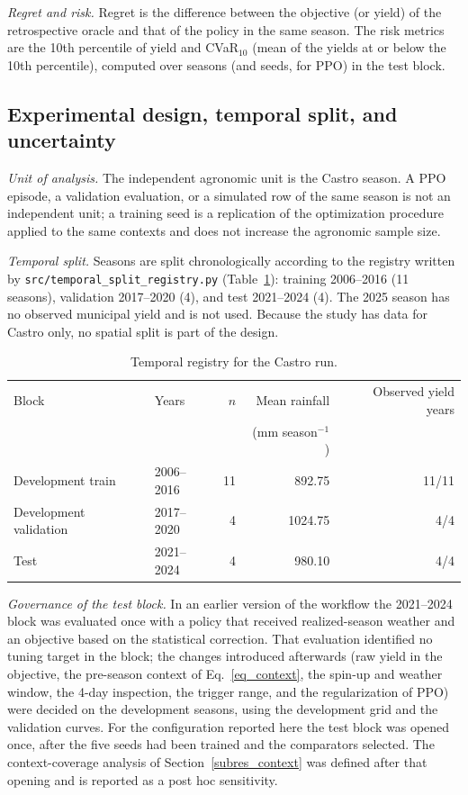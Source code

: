 \documentclass[times,final,authoryear]{elsarticle}
\begin{document}
\emph{Regret and risk.} Regret is the difference between the objective (or yield) of the retrospective oracle and that of the policy in the same season. The risk metrics are the 10th percentile of yield and CVaR$_{10}$ (mean of the yields at or below the 10th percentile), computed over seasons (and seeds, for PPO) in the test block.

\subsection{Experimental design, temporal split, and uncertainty}
\label{subdesign}

\emph{Unit of analysis.} The independent agronomic unit is the Castro season. A PPO episode, a validation evaluation, or a simulated row of the same season is not an independent unit; a training seed is a replication of the optimization procedure applied to the same contexts and does not increase the agronomic sample size.

\emph{Temporal split.} Seasons are split chronologically according to the registry written by \texttt{src/temporal\_split\_registry.py} (Table~\ref{tab_temporal_registry_castro}): training 2006--2016 (11 seasons), validation 2017--2020 (4), and test 2021--2024 (4). The 2025 season has no observed municipal yield and is not used. Because the study has data for Castro only, no spatial split is part of the design.

\begin{table}[!h]
\centering
\scriptsize
\caption{Temporal registry for the Castro run.}
\label{tab_temporal_registry_castro}
\begin{tabular}{llrrr}
\hline
Block & Years & $n$ & Mean rainfall & Observed yield years \\
      &       &     & (mm season$^{-1}$) & \\
\hline
Development train & 2006--2016 & 11 & 892.75 & 11/11 \\
Development validation & 2017--2020 & 4 & 1024.75 & 4/4 \\
Test & 2021--2024 & 4 & 980.10 & 4/4 \\
\hline
\end{tabular}
\end{table}

\emph{Governance of the test block.} In an earlier version of the workflow the 2021--2024 block was evaluated once with a policy that received realized-season weather and an objective based on the statistical correction. That evaluation identified no tuning target in the block; the changes introduced afterwards (raw yield in the objective, the pre-season context of Eq.~\ref{eq_context}, the spin-up and weather window, the 4-day inspection, the trigger range, and the regularization of PPO) were decided on the development seasons, using the development grid and the validation curves. For the configuration reported here the test block was opened once, after the five seeds had been trained and the comparators selected. The context-coverage analysis of Section~\ref{subres_context} was defined after that opening and is reported as a post hoc sensitivity.
\end{document}
